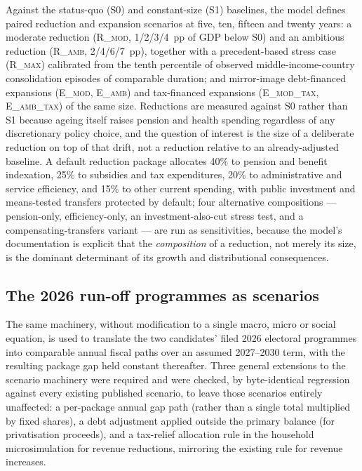 \documentclass[11pt,a4paper]{article}
\begin{document}
Against the status-quo (\textsc{S0}) and constant-size (\textsc{S1}) baselines, the model defines paired reduction and expansion scenarios at five, ten, fifteen and twenty years: a moderate reduction (\textsc{R\_mod}, 1/2/3/4~pp of GDP below \textsc{S0}) and an ambitious reduction (\textsc{R\_amb}, 2/4/6/7~pp), together with a precedent-based stress case (\textsc{R\_max}) calibrated from the tenth percentile of observed middle-income-country consolidation episodes of comparable duration; and mirror-image debt-financed expansions (\textsc{E\_mod}, \textsc{E\_amb}) and tax-financed expansions (\textsc{E\_mod\_tax}, \textsc{E\_amb\_tax}) of the same size. Reductions are measured against \textsc{S0} rather than \textsc{S1} because ageing itself raises pension and health spending regardless of any discretionary policy choice, and the question of interest is the size of a deliberate reduction on top of that drift, not a reduction relative to an already-adjusted baseline. A default reduction package allocates 40\% to pension and benefit indexation, 25\% to subsidies and tax expenditures, 20\% to administrative and service efficiency, and 15\% to other current spending, with public investment and means-tested transfers protected by default; four alternative compositions --- pension-only, efficiency-only, an investment-also-cut stress test, and a compensating-transfers variant --- are run as sensitivities, because the model's documentation is explicit that the \emph{composition} of a reduction, not merely its size, is the dominant determinant of its growth and distributional consequences.

\subsection{The 2026 run-off programmes as scenarios}

The same machinery, without modification to a single macro, micro or social equation, is used to translate the two candidates' filed 2026 electoral programmes into comparable annual fiscal paths over an assumed 2027--2030 term, with the resulting package gap held constant thereafter. Three general extensions to the scenario machinery were required and were checked, by byte-identical regression against every existing published scenario, to leave those scenarios entirely unaffected: a per-package annual gap path (rather than a single total multiplied by fixed shares), a debt adjustment applied outside the primary balance (for privatisation proceeds), and a tax-relief allocation rule in the household microsimulation for revenue reductions, mirroring the existing rule for revenue increases.
\end{document}

